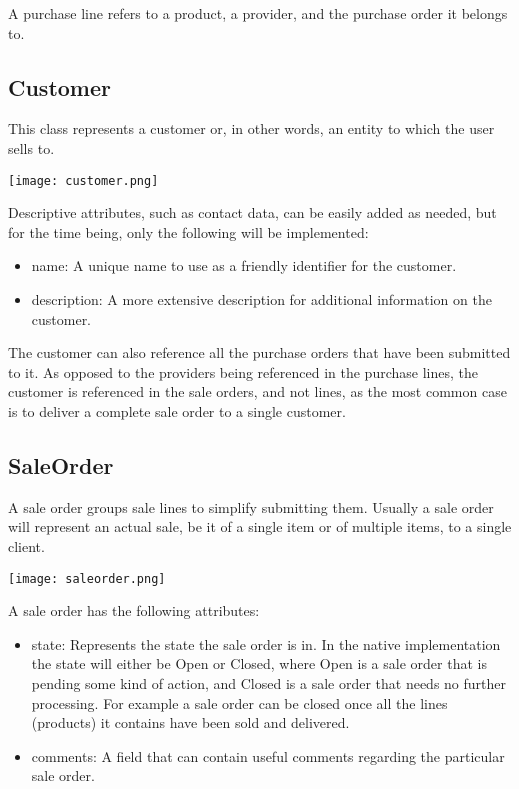 A purchase line refers to a product, a provider, and the purchase order it belongs to.

\subsection{Customer}
This class represents a customer or, in other words, an entity to which the user sells to. 
\begin{center}
\texttt{[image: customer.png]}
\end{center}
Descriptive attributes, such as contact data, can be easily added as needed, but for the time being, only the following will be implemented:

\begin{itemize}
\item name: A unique name to use as a friendly identifier for the customer.
\item description: A more extensive description for additional information on the customer.
\end{itemize}

The customer can also reference all the purchase orders that have been submitted to it. As opposed to the providers being referenced in the purchase lines, the customer is referenced in the sale orders, and not lines, as the most common case is to deliver a complete sale order to a single customer.

\subsection{SaleOrder}
A sale order groups sale lines to simplify submitting them. Usually a sale order will represent an actual sale, be it of a single item or of multiple items, to a single client.
\begin{center}
\texttt{[image: saleorder.png]}
\end{center}
A sale order has the following attributes:

\begin{itemize}
\item state: Represents the state the sale order is in. In the native implementation the state will either be Open or Closed, where Open is a sale order that is pending some kind of action, and Closed is a sale order that needs no further processing. For example a sale order can be closed once all the lines (products) it contains have been sold and delivered.
\item comments: A field that can contain useful comments regarding the particular sale order.
\end{itemize}

